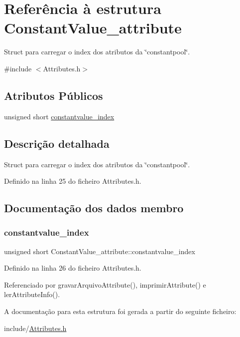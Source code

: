 \hypertarget{structConstantValue__attribute}{}\section{Referência à estrutura Constant\+Value\+\_\+attribute}
\label{structConstantValue__attribute}


Struct para carregar o index dos atributos da \char`\"{}constantpool\char`\"{}.  




{\ttfamily \#include $<$Attributes.\+h$>$}

\subsection*{Atributos Públicos}
\begin{DoxyCompactItemize}
\item 
unsigned short \hyperlink{structConstantValue__attribute_a0adab5167ac340ab1ca1bceb8014b758}{constantvalue\+\_\+index}
\end{DoxyCompactItemize}


\subsection{Descrição detalhada}
Struct para carregar o index dos atributos da \char`\"{}constantpool\char`\"{}. 

Definido na linha 25 do ficheiro Attributes.\+h.



\subsection{Documentação dos dados membro}
\mbox{\label{structConstantValue__attribute_a0adab5167ac340ab1ca1bceb8014b758}} 
\subsubsection{\texorpdfstring{constantvalue\+\_\+index}{constantvalue\_index}}
{\footnotesize\ttfamily unsigned short Constant\+Value\+\_\+attribute\+::constantvalue\+\_\+index}



Definido na linha 26 do ficheiro Attributes.\+h.



Referenciado por gravar\+Arquivo\+Attribute(), imprimir\+Attribute() e ler\+Attribute\+Info().



A documentação para esta estrutura foi gerada a partir do seguinte ficheiro\+:\begin{DoxyCompactItemize}
\item 
include/\hyperlink{Attributes_8h}{Attributes.\+h}\end{DoxyCompactItemize}

